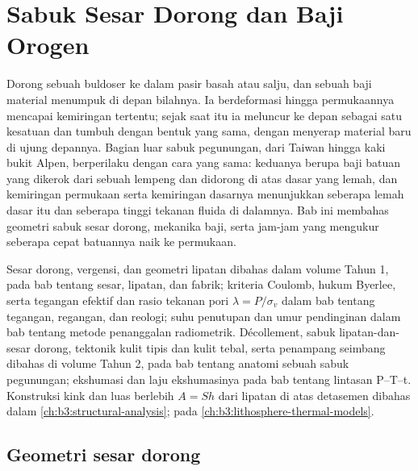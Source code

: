\chapter{Sabuk Sesar Dorong dan Baji Orogen}\label{ch:b3:orogenic-wedges}

Dorong sebuah buldoser ke dalam pasir basah atau salju, dan sebuah baji material menumpuk
di depan bilahnya. Ia berdeformasi hingga permukaannya mencapai kemiringan tertentu;
sejak saat itu ia meluncur ke depan sebagai satu kesatuan dan tumbuh dengan bentuk yang sama,
dengan menyerap material baru di ujung depannya. Bagian luar sabuk pegunungan, dari
Taiwan hingga kaki bukit Alpen, berperilaku dengan cara yang sama: keduanya berupa baji
batuan yang dikerok dari sebuah lempeng dan didorong di atas dasar yang lemah, dan
kemiringan permukaan serta kemiringan dasarnya menunjukkan seberapa lemah dasar itu dan seberapa tinggi
tekanan fluida di dalamnya. Bab ini membahas geometri sabuk sesar dorong, mekanika baji,
serta jam-jam yang mengukur seberapa cepat
batuannya naik ke permukaan.

\begin{recall}
Sesar dorong, vergensi, dan geometri lipatan dibahas dalam volume Tahun 1, pada bab
tentang sesar, lipatan, dan fabrik; kriteria Coulomb, hukum Byerlee, serta
tegangan efektif dan rasio tekanan pori $\lambda = P/\sigma_v$ dalam
bab tentang tegangan, regangan, dan reologi; suhu penutupan dan umur pendinginan
dalam bab tentang metode penanggalan radiometrik. Décollement, sabuk lipatan-dan-sesar dorong,
tektonik kulit tipis dan kulit tebal, serta
penampang seimbang dibahas di volume Tahun 2, pada bab tentang anatomi sebuah
sabuk pegunungan; ekshumasi dan laju ekshumasinya pada bab tentang lintasan P--T--t. Konstruksi
kink dan luas berlebih $A = Sh$ dari lipatan di atas detasemen
dibahas dalam \cref{ch:b3:structural-analysis};  pada
\cref{ch:b3:lithosphere-thermal-models}.
\end{recall}

\section{Geometri sesar dorong}\label{sec:b3:orogenic-wedges:geometry}

